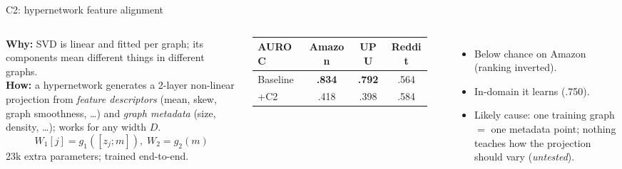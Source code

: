 \documentclass[aspectratio=169,11pt]{beamer}
\begin{document}
\begin{frame}{C2: hypernetwork feature alignment}
\begin{columns}[T]
\textbf{Why:} SVD is linear and fitted per graph; its components mean different things in different graphs.\\[4pt]
\textbf{How:} a hypernetwork generates a 2-layer non-linear projection from \emph{feature descriptors} (mean, skew, graph smoothness, \dots) and \emph{graph metadata} (size, density, \dots); works for any width $D$.
\[
W_1[j]=g_1([z_j;m]),\; W_2=g_2(m)
\]
23k extra parameters; trained end-to-end.
\small
\begin{tabular}{lccc}
\toprule
AUROC & Amazon & UPU & Reddit\\ \midrule
Baseline & \textbf{.834} & \textbf{.792} & .564\\
+C2 & \textcolor{bad}{.418} & \textcolor{bad}{.398} & .584\\ \bottomrule
\end{tabular}\\[4pt]
\begin{itemize}\footnotesize
\item \alert{Below chance} on Amazon (ranking inverted).
\item In-domain it learns (.750).
\item Likely cause: one training graph $=$ one metadata point; nothing teaches how the projection should vary (\emph{untested}).
\end{itemize}
\end{columns}
\end{frame}
\end{document}
